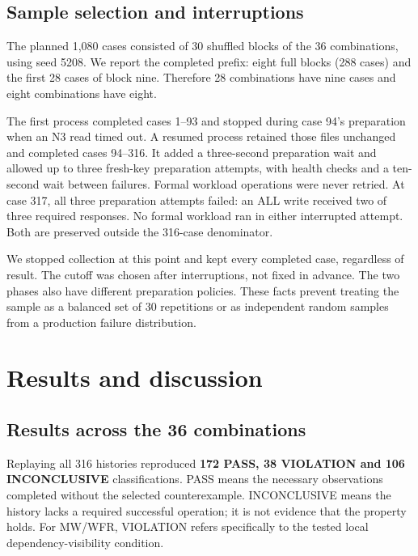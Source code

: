 \documentclass[lang=en,11pt,a4paper,bibend=bibtex]{elegantpaper}
\begin{document}
\subsection{Sample selection and interruptions}
The planned 1,080 cases consisted of 30 shuffled blocks of the 36 combinations, using seed 5208. We report the completed prefix: eight full blocks (288 cases) and the first 28 cases of block nine. Therefore 28 combinations have nine cases and eight combinations have eight.

The first process completed cases 1--93 and stopped during case 94's preparation when an N3 read timed out. A resumed process retained those files unchanged and completed cases 94--316. It added a three-second preparation wait and allowed up to three fresh-key preparation attempts, with health checks and a ten-second wait between failures. Formal workload operations were never retried. At case 317, all three preparation attempts failed: an ALL write received two of three required responses. No formal workload ran in either interrupted attempt. Both are preserved outside the 316-case denominator.

We stopped collection at this point and kept every completed case, regardless of result. The cutoff was chosen after interruptions, not fixed in advance. The two phases also have different preparation policies. These facts prevent treating the sample as a balanced set of 30 repetitions or as independent random samples from a production failure distribution.

\section{Results and discussion}
\subsection{Results across the 36 combinations}
Replaying all 316 histories reproduced \textbf{172 PASS, 38 VIOLATION and 106 INCONCLUSIVE} classifications. PASS means the necessary observations completed without the selected counterexample. INCONCLUSIVE means the history lacks a required successful operation; it is not evidence that the property holds. For MW/WFR, VIOLATION refers specifically to the tested local dependency-visibility condition.
\end{document}
